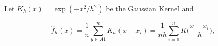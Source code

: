 Let  $K_h(x) = \exp( -x^2/h^2)$ be the Gaussian Kernel and

\[
    \hat{f}_h(x) = \frac{1}{n}\sum_{ y \in A1}^n K_h (x - x_i) = \frac{1}{nh} \sum_{i=1}^n K\Big(\frac{x-x_i}{h}\Big),
  \]